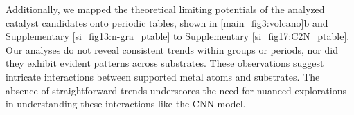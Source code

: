 Additionally, we mapped the theoretical limiting potentials of the analyzed catalyst candidates onto periodic tables, shown in \cref{main_fig3:volcano}b and Supplementary \cref{si_fig13:n-gra_ptable} to Supplementary \cref{si_fig17:C2N_ptable}.
Our analyses do not reveal consistent trends within groups or periods, nor did they exhibit evident patterns across substrates.
These observations suggest intricate interactions between supported metal atoms and substrates.
The absence of straightforward trends underscores the need for nuanced explorations in understanding these interactions like the CNN model.
